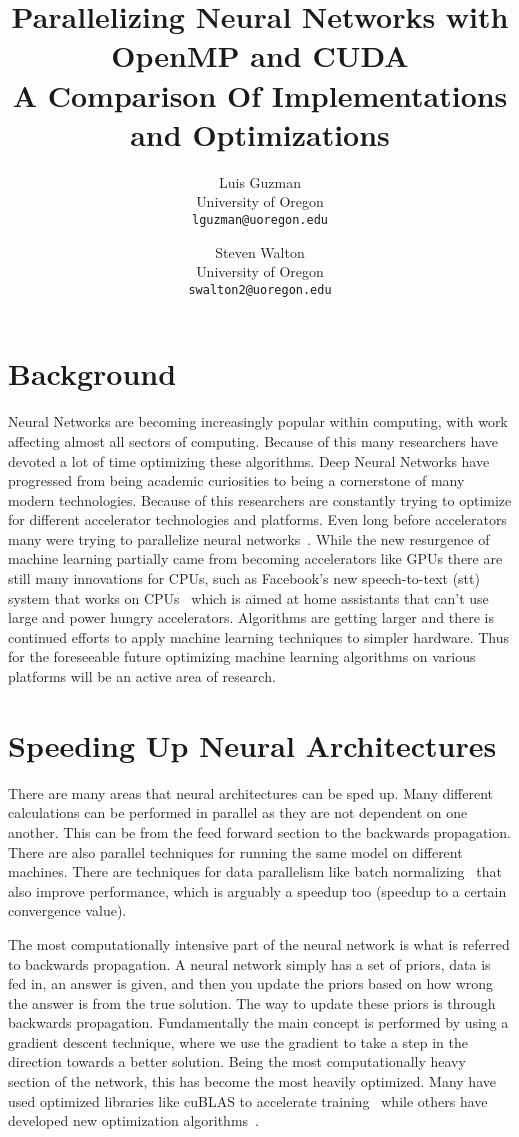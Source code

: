 \documentclass[10pt,twocolumn,letterpaper]{article}
\title{Parallelizing Neural Networks with OpenMP and CUDA\\
\small{A Comparison Of Implementations and Optimizations}}
\author{Luis Guzman\\
University of Oregon\\
{\tt\small lguzman@uoregon.edu}
\and
Steven Walton\\
University of Oregon\\
{\tt\small swalton2@uoregon.edu}
}
\begin{document}
 
%
\maketitle 
%
\section{Background} 
%
Neural Networks are becoming increasingly popular within computing, with work
affecting almost all sectors of computing. Because of this many researchers have
devoted a lot of time optimizing these algorithms. Deep Neural Networks have
progressed from being academic curiosities to being a cornerstone of many modern
technologies. Because of this researchers are constantly trying to optimize for
different accelerator technologies and platforms. Even long before accelerators
many were trying to parallelize neural networks~\cite{10.1007/BFb0024235}.
While the new resurgence of machine learning partially came from becoming
accelerators like GPUs there are still many innovations for CPUs,
such as Facebook's new speech-to-text (stt) system that works on
CPUs~\cite{fbcpu} which is aimed at home assistants that can't use large and power
hungry accelerators. Algorithms are getting larger and there is continued
efforts to apply machine learning techniques to simpler hardware. Thus for the
foreseeable future optimizing machine learning algorithms on various platforms
will be an active area of research.  

\section{Speeding Up Neural Architectures}
%
There are many areas that neural architectures can be sped up. Many different
calculations can be performed in parallel as they are not dependent on one
another. This can be from the feed forward section to the backwards propagation.
There are also parallel techniques for running the same model on different
machines. There are techniques for data parallelism like batch 
normalizing~\cite{DBLP:journals/corr/IoffeS15} that also improve performance,
which is arguably a speedup too (speedup to a certain convergence value). 

The most computationally intensive part of the neural network is what is
referred to backwards propagation. A neural network simply has a set of priors,
data is fed in, an answer is given, and then you update the priors based on how
wrong the answer is from the true solution. The way to update these priors is
through backwards propagation. Fundamentally the main concept is performed by
using a gradient descent technique, where we use the gradient to take a step in
the direction towards a better solution. Being the most computationally heavy
section of the network, this has become the most heavily optimized. Many have
used optimized libraries like cuBLAS to accelerate training~\cite{5708849} while
others have developed new optimization algorithms~\cite{DBLP:journals/corr/KingmaB14}. 
\end{document}
